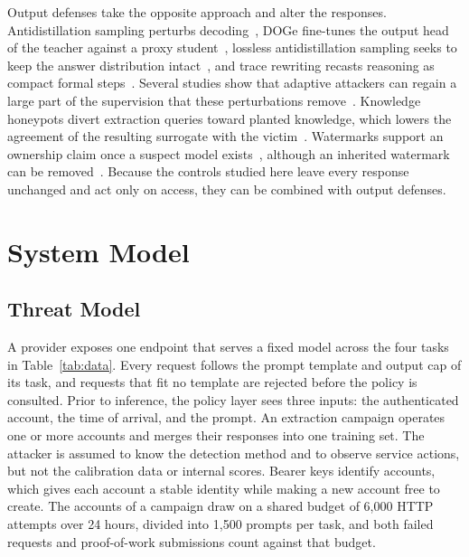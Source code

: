 \documentclass[conference]{IEEEtran}
\begin{document}
Output defenses take the opposite approach and alter the responses. Antidistillation sampling perturbs decoding~\cite{savani2025antidistillation}, DOGe fine-tunes the output head of the teacher against a proxy student~\cite{li2025doge}, lossless antidistillation sampling seeks to keep the answer distribution intact~\cite{diao2026lossless}, and trace rewriting recasts reasoning as compact formal steps~\cite{ma2026tracerewriting}. Several studies show that adaptive attackers can regain a large part of the supervision that these perturbations remove~\cite{libon2026break,allouah2026game,zhu2026learnability}. Knowledge honeypots divert extraction queries toward planted knowledge, which lowers the agreement of the resulting surrogate with the victim~\cite{dai2026knowledgetrap}. Watermarks support an ownership claim once a suspect model exists~\cite{szyller2021dawn,jia2021entangled,chang2026basins}, although an inherited watermark can be removed~\cite{pan2025watermarks}. Because the controls studied here leave every response unchanged and act only on access, they can be combined with output defenses.

\section{System Model}
\label{sec:system}
\subsection{Threat Model}
A provider exposes one endpoint that serves a fixed model across the four tasks in Table~\ref{tab:data}. Every request follows the prompt template and output cap of its task, and requests that fit no template are rejected before the policy is consulted. Prior to inference, the policy layer sees three inputs: the authenticated account, the time of arrival, and the prompt. An extraction campaign operates one or more accounts and merges their responses into one training set. The attacker is assumed to know the detection method and to observe service actions, but not the calibration data or internal scores. Bearer keys identify accounts, which gives each account a stable identity while making a new account free to create. The accounts of a campaign draw on a shared budget of 6,000 HTTP attempts over 24 hours, divided into 1,500 prompts per task, and both failed requests and proof-of-work submissions count against that budget.
\end{document}
